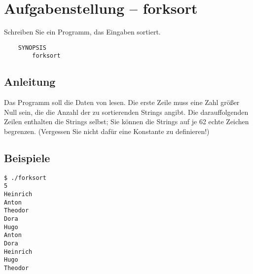 




\section*{Aufgabenstellung -- forksort}
Schreiben Sie ein Programm, das Eingaben sortiert.
\begin{verbatim}
    SYNOPSIS
        forksort
\end{verbatim}

\subsection*{Anleitung}
Das Programm soll die Daten von  lesen. Die erste Zeile muss
eine Zahl größer Null sein, die die Anzahl der zu sortierenden Strings angibt.
Die darauffolgenden Zeilen enthalten die Strings selbst; Sie können die
Strings auf je 62 echte Zeichen begrenzen. (Vergessen Sie nicht dafür eine
Konstante zu definieren!)

\subsection*{Beispiele}
\begin{verbatim}
$ ./forksort
5
Heinrich
Anton
Theodor
Dora
Hugo
Anton
Dora
Heinrich
Hugo
Theodor
\end{verbatim}

